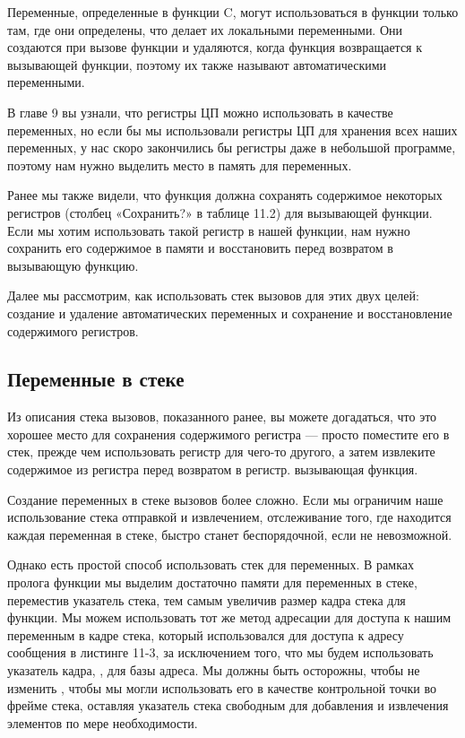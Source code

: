 Переменные, определенные в функции C, могут использоваться в функции только там, где они определены, что делает их локальными переменными. Они создаются при вызове функции и удаляются, когда функция возвращается к вызывающей функции, поэтому их также называют автоматическими переменными.

В главе 9 вы узнали, что регистры ЦП можно использовать в качестве переменных, но если бы мы использовали регистры ЦП для хранения всех наших переменных, у нас скоро закончились бы регистры даже в небольшой программе, поэтому нам нужно выделить место в память для переменных.

Ранее мы также видели, что функция должна сохранять содержимое некоторых регистров (столбец «Сохранить?» в таблице 11.2) для вызывающей функции. Если мы хотим использовать такой регистр в нашей функции, нам нужно сохранить его содержимое в памяти и восстановить перед возвратом в вызывающую функцию.

Далее мы рассмотрим, как использовать стек вызовов для этих двух целей: создание и удаление автоматических переменных и сохранение и восстановление содержимого регистров.

\subsection{Переменные в стеке}

Из описания стека вызовов, показанного ранее, вы можете догадаться, что это хорошее место для сохранения содержимого регистра — просто поместите его в стек, прежде чем использовать регистр для чего-то другого, а затем извлеките содержимое из регистра перед возвратом в регистр. вызывающая функция.

Создание переменных в стеке вызовов более сложно. Если мы ограничим наше использование стека отправкой и извлечением, отслеживание того, где находится каждая переменная в стеке, быстро станет беспорядочной, если не невозможной.

Однако есть простой способ использовать стек для переменных. В рамках пролога функции мы выделим достаточно памяти для переменных в стеке, переместив указатель стека, тем самым увеличив размер кадра стека для функции. Мы можем использовать тот же метод адресации для доступа к нашим переменным в кадре стека, который использовался для доступа к адресу сообщения в листинге 11-3, за исключением того, что мы будем использовать указатель кадра, , для базы адреса. Мы должны быть осторожны, чтобы не изменить , чтобы мы могли использовать его в качестве контрольной точки во фрейме стека, оставляя указатель стека свободным для добавления и извлечения элементов по мере необходимости.

